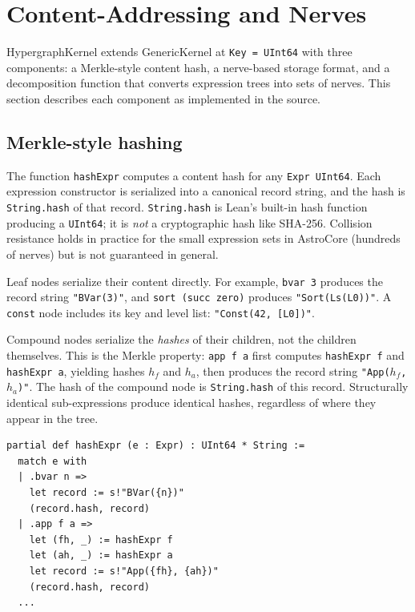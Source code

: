 \section{Content-Addressing and Nerves}\label{sec:nerves}

HypergraphKernel extends GenericKernel at \texttt{Key = UInt64} with three components: a Merkle-style content hash, a nerve-based storage format, and a decomposition function that converts expression trees into sets of nerves.  This section describes each component as implemented in the source.

\subsection{Merkle-style hashing}\label{sec:hash}

The function \texttt{hashExpr} computes a content hash for any \texttt{Expr UInt64}.  Each expression constructor is serialized into a canonical record string, and the hash is \texttt{String.hash} of that record.  \texttt{String.hash} is Lean's built-in hash function producing a \texttt{UInt64}; it is \emph{not} a cryptographic hash like SHA-256.  Collision resistance holds in practice for the small expression sets in AstroCore (hundreds of nerves) but is not guaranteed in general.

Leaf nodes serialize their content directly.  For example, \texttt{bvar 3} produces the record string \texttt{"BVar(3)"}, and \texttt{sort (succ zero)} produces \texttt{"Sort(Ls(L0))"}.  A \texttt{const} node includes its key and level list: \texttt{"Const(42, [L0])"}.

Compound nodes serialize the \emph{hashes} of their children, not the children themselves.  This is the Merkle property: \texttt{app f a} first computes \texttt{hashExpr f} and \texttt{hashExpr a}, yielding hashes $h_f$ and $h_a$, then produces the record string \texttt{"App($h_f$, $h_a$)"}.  The hash of the compound node is \texttt{String.hash} of this record.  Structurally identical sub-expressions produce identical hashes, regardless of where they appear in the tree.

\begin{lstlisting}[language={},morekeywords={partial,def,match,with,let}]
partial def hashExpr (e : Expr) : UInt64 * String :=
  match e with
  | .bvar n =>
    let record := s!"BVar({n})"
    (record.hash, record)
  | .app f a =>
    let (fh, _) := hashExpr f
    let (ah, _) := hashExpr a
    let record := s!"App({fh}, {ah})"
    (record.hash, record)
  ...
\end{lstlisting}

